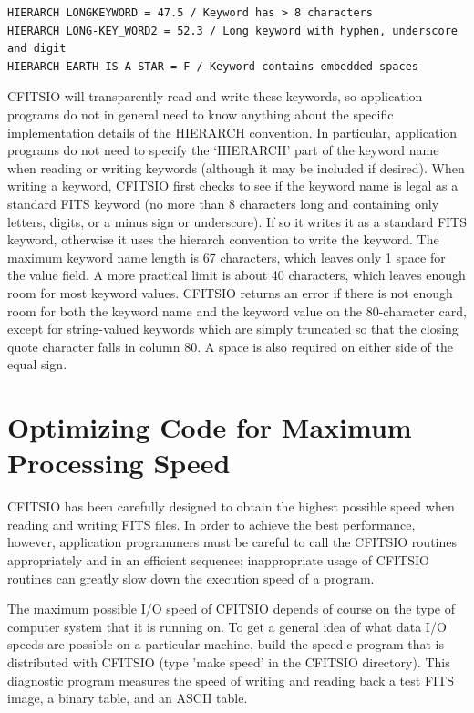 \documentclass[11pt]{book}
\begin{document}
\begin{verbatim}
HIERARCH LONGKEYWORD = 47.5 / Keyword has > 8 characters
HIERARCH LONG-KEY_WORD2 = 52.3 / Long keyword with hyphen, underscore and digit
HIERARCH EARTH IS A STAR = F / Keyword contains embedded spaces
\end{verbatim}
CFITSIO will transparently read and write these keywords, so application
programs do not in general need to know anything about the specific
implementation details of the HIERARCH convention.  In particular,
application programs do not need to specify the `HIERARCH' part of the
keyword name when reading or writing keywords (although it
may be included if desired).  When writing a keyword, CFITSIO first
checks to see if the keyword name is legal as a standard FITS keyword
(no more than 8 characters long and containing only letters, digits, or
a minus sign or underscore). If so it writes it as a standard FITS
keyword, otherwise it uses the hierarch convention to write the
keyword.   The maximum keyword name length is 67 characters, which
leaves only 1 space for the value field.  A more practical limit is
about 40 characters, which leaves enough room for most keyword values.
CFITSIO returns an error if there is not enough room for both the
keyword name and the keyword value on the 80-character card, except for
string-valued keywords which are simply truncated so that the closing
quote character falls in column 80. A space is also required on either
side of the equal sign.


\section{Optimizing Code for Maximum Processing Speed}

CFITSIO has been carefully designed to obtain the highest possible
speed when reading and writing FITS files.  In order to achieve the
best performance, however, application programmers must be careful to
call the CFITSIO routines appropriately and in an efficient sequence;
inappropriate usage of CFITSIO routines can greatly slow down the
execution speed of a program.

The maximum possible I/O speed of CFITSIO depends of course on the type
of computer system that it is running on.  To get a general idea of what
data I/O speeds are possible on a particular machine, build the speed.c
program that is distributed with CFITSIO (type 'make speed' in the CFITSIO
directory).  This diagnostic program measures the speed of writing and reading
back a test FITS image, a binary table, and an ASCII table.
\end{document}
